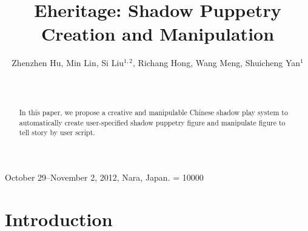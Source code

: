 \documentclass[letter]{sig-alternate}
\begin{document}
 {October 29--November 2, 2012, Nara, Japan.} 
\widowpenalty = 10000

%

\title{Eheritage: Shadow Puppetry Creation and Manipulation}






\author{\alignauthor Zhenzhen Hu, Min Lin, Si Liu$^{1,2}$, Richang Hong, Wang Meng,   Shuicheng Yan$^{1}$ \\
   \\
   \\
} 


\maketitle
\begin{abstract}
In this paper, we propose a creative and manipulable Chinese shadow play system to automatically create user-specified shadow puppetry figure and manipulate figure to tell story by user script. 

\end{abstract}












\section{Introduction}
\end{document}
